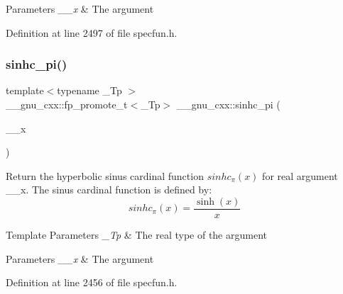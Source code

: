 \begin{DoxyParams}{Parameters}
{\em \+\_\+\+\_\+x} & The argument \\
\hline
\end{DoxyParams}


Definition at line 2497 of file specfun.\+h.

\mbox{\label{group__gnu__math__spec__func_ga8bb6034e28d48879845bf64818cc06e1}} 
\subsubsection{\texorpdfstring{sinhc\+\_\+pi()}{sinhc\_pi()}}
{\footnotesize\ttfamily template$<$typename \+\_\+\+Tp $>$ \\
\+\_\+\+\_\+gnu\+\_\+cxx\+::fp\+\_\+promote\+\_\+t$<$\+\_\+\+Tp$>$ \+\_\+\+\_\+gnu\+\_\+cxx\+::sinhc\+\_\+pi (\begin{DoxyParamCaption}\item[{\+\_\+\+Tp}]{\+\_\+\+\_\+x }\end{DoxyParamCaption})\hspace{0.3cm}{\ttfamily [inline]}}

Return the hyperbolic sinus cardinal function $ sinhc_\pi(x) $ for real argument {\ttfamily \+\_\+\+\_\+x}. The sinus cardinal function is defined by\+: \[ sinhc_\pi(x) = \frac{\sinh(x)}{x} \]


\begin{DoxyTemplParams}{Template Parameters}
{\em \+\_\+\+Tp} & The real type of the argument \\
\hline
\end{DoxyTemplParams}

\begin{DoxyParams}{Parameters}
{\em \+\_\+\+\_\+x} & The argument \\
\hline
\end{DoxyParams}


Definition at line 2456 of file specfun.\+h.

\mbox{\label{group__gnu__math__spec__func_ga26e54504db6541550266140f5264acbe}} 
